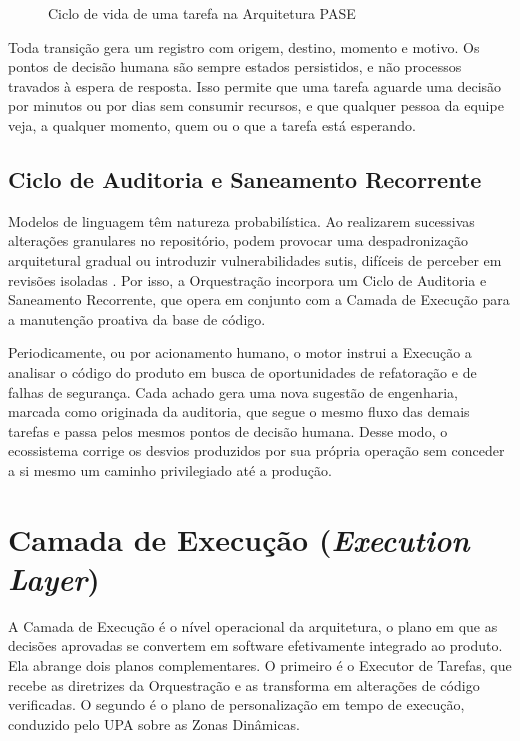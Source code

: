 \begin{figure}[htb]
\centering
\caption{Ciclo de vida de uma tarefa na Arquitetura PASE}
\label{fig:5}
\end{figure}

Toda transição gera um registro com origem, destino, momento e motivo. Os pontos de decisão humana são sempre estados persistidos, e não processos travados à espera de resposta. Isso permite que uma tarefa aguarde uma decisão por minutos ou por dias sem consumir recursos, e que qualquer pessoa da equipe veja, a qualquer momento, quem ou o que a tarefa está esperando.

\subsection{Ciclo de Auditoria e Saneamento Recorrente}\label{sec:4.4.6}

Modelos de linguagem têm natureza probabilística. Ao realizarem sucessivas alterações granulares no repositório, podem provocar uma despadronização arquitetural gradual \cite{kravchuk2025modular} ou introduzir vulnerabilidades sutis, difíceis de perceber em revisões isoladas \cite{hou2024llm4se}. Por isso, a Orquestração incorpora um Ciclo de Auditoria e Saneamento Recorrente, que opera em conjunto com a Camada de Execução para a manutenção proativa da base de código.

Periodicamente, ou por acionamento humano, o motor instrui a Execução a analisar o código do produto em busca de oportunidades de refatoração e de falhas de segurança. Cada achado gera uma nova sugestão de engenharia, marcada como originada da auditoria, que segue o mesmo fluxo das demais tarefas e passa pelos mesmos pontos de decisão humana. Desse modo, o ecossistema corrige os desvios produzidos por sua própria operação sem conceder a si mesmo um caminho privilegiado até a produção.

\section[Camada de Execução (Execution Layer)]{Camada de Execução (\textit{Execution Layer})}\label{sec:4.5}

A Camada de Execução é o nível operacional da arquitetura, o plano em que as decisões aprovadas se convertem em software efetivamente integrado ao produto. Ela abrange dois planos complementares. O primeiro é o Executor de Tarefas, que recebe as diretrizes da Orquestração e as transforma em alterações de código verificadas. O segundo é o plano de personalização em tempo de execução, conduzido pelo UPA sobre as Zonas Dinâmicas.

